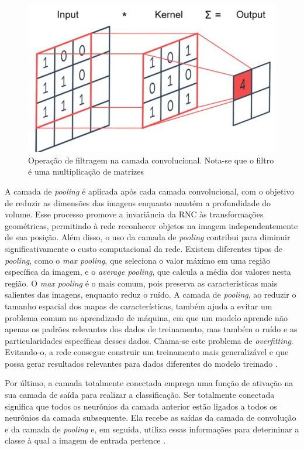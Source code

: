 \begin{figure}[!h]
    \center
    \begin{minipage}{0.9\linewidth}
    \center
    \captionsetup{justification=centering,margin=0.5cm,font=small}
    \includegraphics[width=0.7\linewidth]{img/cap2/filtro.png}
    \caption{ Operação de filtragem na camada convolucional. Nota-se que o filtro é uma multiplicação de matrizes \cite{shorthistory}} 
    \label{fig:kernel}
    \end{minipage}
\end{figure}

A camada de \textit{pooling} é aplicada após cada camada convolucional, com o objetivo de reduzir as dimensões das imagens enquanto mantém a profundidade do volume. Esse processo promove a invariância da RNC às transformações geométricas, permitindo à rede reconhecer objetos na imagem independentemente de sua posição. Além disso, o uso da camada de \textit{pooling} contribui para diminuir significativamente o custo computacional da rede. Existem diferentes tipos de \textit{pooling}, como o \textit{max pooling}, que seleciona o valor máximo em uma região específica da imagem, e o \textit{average pooling}, que calcula a média dos valores nesta região. O \textit{max pooling} é o mais comum, pois preserva as características mais salientes das imagens, enquanto reduz o ruído. A camada de \textit{pooling}, ao reduzir o tamanho espacial dos mapas de características, também ajuda a evitar um problema comum no aprendizado de máquina, em que um modelo aprende não apenas os padrões relevantes dos dados de treinamento, mas também o ruído e as particularidades específicas desses dados. Chama-se este problema de \textit{overfitting}. Evitando-o, a rede consegue construir um treinamento mais generalizável e que possa gerar resultados relevantes para dados diferentes do modelo treinado \cite{lima2020captcha}.

Por último, a camada totalmente conectada emprega uma função de ativação na sua camada de saída para realizar a classificação. Ser totalmente conectada significa que todos os neurônios da camada anterior estão ligados a todos os neurônios da camada subsequente. Ela recebe as saídas da camada de convolução e da camada de \textit{pooling} e, em seguida, utiliza essas informações para determinar a classe à qual a imagem de entrada pertence \cite{silva2018estudo}.

